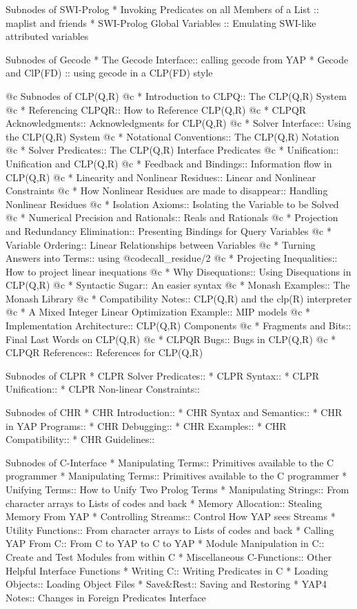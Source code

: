 Subnodes of SWI-Prolog
* Invoking Predicates on all Members of a List :: maplist and friends
* SWI-Prolog Global Variables :: Emulating SWI-like attributed variables

Subnodes of Gecode
* The Gecode Interface:: calling gecode from YAP
* Gecode and ClP(FD) :: using gecode in a CLP(FD) style

@c Subnodes of CLP(Q,R)
@c * Introduction to CLPQ:: The CLP(Q,R) System
@c * Referencing CLPQR:: How to Reference CLP(Q,R)
@c * CLPQR Acknowledgments:: Acknowledgments for CLP(Q,R)
@c * Solver Interface:: Using the CLP(Q,R) System
@c * Notational Conventions:: The CLP(Q,R) Notation
@c * Solver Predicates:: The CLP(Q,R) Interface Predicates
@c * Unification:: Unification and CLP(Q,R)
@c * Feedback and Bindings:: Information flow in CLP(Q,R)
@c * Linearity and Nonlinear Residues:: Linear and Nonlinear Constraints
@c * How Nonlinear Residues are made to disappear:: Handling Nonlinear Residues
@c * Isolation Axioms:: Isolating the Variable to be Solved
@c * Numerical Precision and Rationals:: Reals and Rationals
@c * Projection and Redundancy Elimination:: Presenting Bindings for Query Variables
@c * Variable Ordering:: Linear Relationships between Variables
@c * Turning Answers into Terms:: using @code{call_residue/2}
@c * Projecting Inequalities:: How to project linear inequations
@c * Why Disequations:: Using Disequations in CLP(Q,R)
@c * Syntactic Sugar:: An easier syntax
@c * Monash Examples:: The Monash Library
@c * Compatibility Notes:: CLP(Q,R) and the clp(R) interpreter
@c * A Mixed Integer Linear Optimization Example:: MIP models
@c * Implementation Architecture:: CLP(Q,R) Components
@c * Fragments and Bits:: Final Last Words on CLP(Q,R)
@c * CLPQR Bugs:: Bugs in CLP(Q,R)
@c * CLPQR References:: References for CLP(Q,R)

Subnodes of CLPR
* CLPR Solver Predicates::
* CLPR Syntax::
* CLPR Unification::
* CLPR Non-linear Constraints::               

Subnodes of CHR
* CHR Introduction::            
* CHR Syntax and Semantics::
* CHR in YAP Programs::
* CHR Debugging::               
* CHR Examples::       
* CHR Compatibility::     
* CHR Guidelines::  

Subnodes of C-Interface
* Manipulating Terms:: Primitives available to the C programmer
* Manipulating Terms:: Primitives available to the C programmer
* Unifying Terms:: How to Unify Two Prolog Terms
* Manipulating Strings:: From character arrays to Lists of codes and back
* Memory Allocation:: Stealing Memory From YAP
* Controlling Streams:: Control How YAP sees Streams
* Utility Functions:: From character arrays to Lists of codes and back
* Calling YAP From C:: From C to YAP to C to YAP 
* Module Manipulation in C:: Create and Test Modules from within C
* Miscellaneous C-Functions:: Other Helpful Interface Functions
* Writing C:: Writing Predicates in C
* Loading Objects:: Loading Object Files
* Save&Rest:: Saving and Restoring
* YAP4 Notes:: Changes in Foreign Predicates Interface

